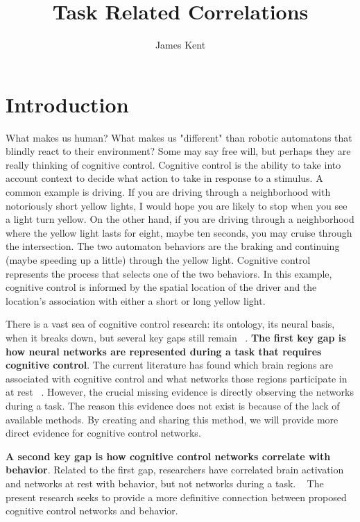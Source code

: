 \documentclass[phd,appendix,figures]{uithesis}
\title{Task Related Correlations}
\author{James Kent}
\begin{document}
\frontmatter

\chapter{Introduction}

What makes us human?
What makes us "different" than robotic automatons that blindly react to their environment?
Some may say free will, but perhaps they are really thinking of cognitive control.
Cognitive control is the ability to take into account context to decide what action to take in response to a stimulus. 
A common example is driving.
If you are driving through a neighborhood with notoriously short yellow lights, I would hope you are likely to stop when you see a light turn yellow.
On the other hand, if you are driving through a neighborhood where the yellow light lasts for eight, maybe ten seconds, you may cruise through the intersection.
The two automaton behaviors are the braking and continuing (maybe speeding up a little) through the yellow light.
Cognitive control represents the process that selects one of the two behaviors.
In this example, cognitive control is informed by the spatial location of the driver and the location's association with either a short or long yellow light.

There is a vast sea of cognitive control research: its ontology, its neural basis, when it breaks down, but several key gaps still remain ~\citep{Gratton2017,Dosenbach2010,Braver2000}.
\textbf{The first key gap is how neural networks are represented during a task that requires cognitive control}.
The current literature has found which brain regions are associated with cognitive control and what networks those regions participate in at rest ~\citep{Gratton2017a,Lerman-Sinkoff2017,Herd2006,Rizio2012,Cooper2015,AppelBaum2014,Dosenbach2007}.
However, the crucial missing evidence is directly observing the networks during a task.
The reason this evidence does not exist is because of the lack of available methods.
By creating and sharing this method, we will provide more direct evidence for cognitive control networks.

\textbf{A second key gap is how cognitive control networks correlate with behavior}.
Related to the first gap, researchers have correlated brain activation and networks at rest with behavior, but not networks during a task. ~\citep{Nomura2010,Egner2004,Gonthier2016a,Braver2010,Huang2017}
The present research seeks to provide a more definitive connection between proposed cognitive control networks and behavior.
\end{document}
